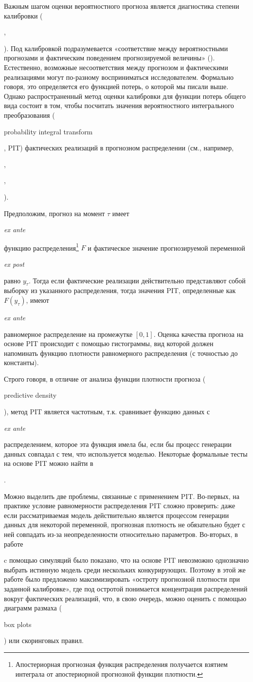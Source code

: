 \documentclass[11pt]{article} %
\newcommand{\eng}[1]{\begin{otherlanguage}{english}#1\end{otherlanguage}}
\begin{document}
Важным шагом оценки вероятностного прогноза является %
диагностика  степени калибровки (\eng{\cite{gneiting_al_2007}}, \eng{\cite{mitchell_wallis_2011}}). Под калибровкой подразумевается «соответствие между вероятностными прогнозами и фактическим поведением прогнозируемой величины» (\cite[p.118]{tsyplakov_2012}). Естественно, возможные несоответствия между прогнозом и фактическими реализациями могут по-разному восприниматься исследователем. Формально говоря, это определяется его функцией потерь, о которой мы писали выше. Однако распространенный метод оценки калибровки для функции потерь общего вида состоит в том, чтобы посчитать значения вероятностного интегрального преобразования (\eng{probability integral transform}, PIT) фактических реализаций в прогнозном распределении (см., например, \eng{\cite{diebold_al_1998}},
\eng{\cite{gerdrup_al_2009}}, \eng{\cite{gonzalez-rivera_sun_2015}}).


Предположим, прогноз на момент $\tau$ имеет \eng{\textit{ex ante}} функцию распределения\footnote{Апостериорная прогнозная функция распределения получается взятием интеграла от апостериорной прогнозной функции плотности.} $F$ и фактическое значение прогнозируемой переменной \eng{\textit{ex post}}  равно $y_{\tau}$. Тогда если фактические реализации действительно представляют собой выборку из указанного распределения, тогда значения PIT, определенные как $F(y_{\tau})$, имеют \eng{\textit{ex ante}} равномерное распределение на промежутке $[0, 1]$. Оценка качества прогноза на основе PIT происходит с помощью гистограммы, вид которой должен напоминать функцию плотности равномерного распределения (с точностью до константы).

Строго говоря, в отличие от анализа функции плотности прогноза (\eng{predictive density}), метод  PIT является частотным, т.к. сравнивает функцию данных с \eng{\textit{ex ante}} распределением, которое эта функция имела бы, если бы процесс генерации данных совпадал с тем, что используется моделью. Некоторые формальные тесты на основе PIT можно найти в \eng{\cite{geweke_amisano_2010}}.

Можно выделить две проблемы, связанные с применением PIT. Во-первых, на практике условие равномерности распределения PIT сложно проверить: даже если рассматриваемая модель действительно является процессом генерации данных для некоторой переменной, прогнозная плотность не обязательно будет с ней совпадать из-за неопределенности относительно параметров. Во-вторых,  в работе \eng{\cite{gneiting_al_2007}} c помощью симуляций было показано, что на основе PIT невозможно однозначно выбрать истинную модель среди нескольких конкурирующих. Поэтому в этой же работе было предложено максимизировать «остроту прогнозной плотности при заданной калибровке», где под остротой понимается концентрация распределений вокруг фактических реализаций, что, в свою очередь, можно оценить с помощью диаграмм размаха (\eng{box plots}) или скоринговых правил.
\end{document}
